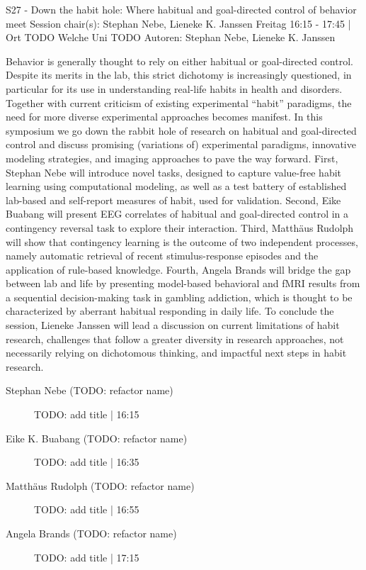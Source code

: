 
            \begin{symposium}
            {S27 - Down the habit hole: Where habitual and goal-directed control of behavior meet}
            {Session chair(s): Stephan Nebe, Lieneke K. Janssen}
            {Freitag 16:15 - 17:45 | Ort TODO}
            {Welche Uni TODO}
            Autoren: Stephan Nebe, Lieneke K. Janssen

Behavior is generally thought to rely on either habitual or goal-directed control. Despite its merits in the lab, this strict dichotomy is increasingly questioned, in particular for its use in understanding real-life habits in health and disorders. Together with current criticism of existing experimental “habit” paradigms, the need for more diverse experimental approaches becomes manifest. In this symposium we go down the rabbit hole of research on habitual and goal-directed control and discuss promising (variations of) experimental paradigms, innovative modeling strategies, and imaging approaches to pave the way forward. First, Stephan Nebe will introduce novel tasks, designed to capture value-free habit learning using computational modeling, as well as a test battery of established lab-based and self-report measures of habit, used for validation. Second, Eike Buabang will present EEG correlates of habitual and goal-directed control in a contingency reversal task to explore their interaction. Third, Matthäus Rudolph will show that contingency learning is the outcome of two independent processes, namely automatic retrieval of recent stimulus-response episodes and the application of rule-based knowledge. Fourth, Angela Brands will bridge the gap between lab and life by presenting model-based behavioral and fMRI results from a sequential decision-making task in gambling addiction, which is thought to be characterized by aberrant habitual responding in daily life. To conclude the session, Lieneke Janssen will lead a discussion on current limitations of habit research, challenges that follow a greater diversity in research approaches, not necessarily relying on dichotomous thinking, and impactful next steps in habit research.
            \begin{description}    
            
                \item [Stephan Nebe  (TODO: refactor name)] TODO: add title \textcolor{mygray}{ | 16:15}    
                
                \item [Eike K. Buabang  (TODO: refactor name)] TODO: add title \textcolor{mygray}{ | 16:35}    
                
                \item [Matthäus Rudolph (TODO: refactor name)] TODO: add title \textcolor{mygray}{ | 16:55}    
                
                \item [Angela Brands (TODO: refactor name)] TODO: add title \textcolor{mygray}{ | 17:15}    
                
            \end{description} 
            \end{symposium}
            
